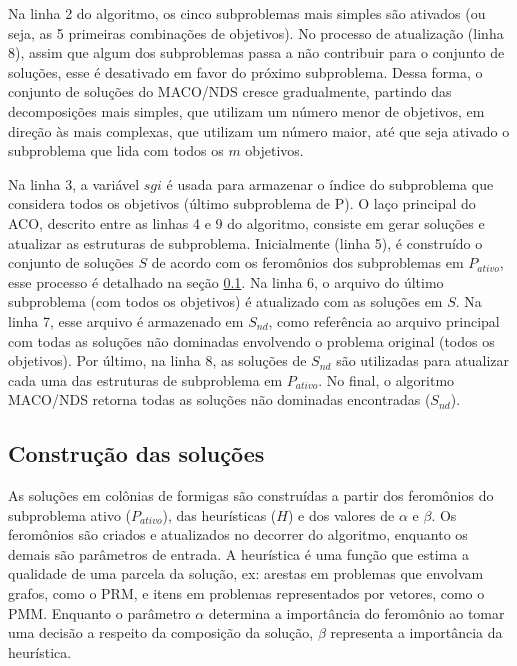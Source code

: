 Na linha 2 do algoritmo, os cinco subproblemas mais simples são ativados (ou seja, as 5 primeiras combinações de objetivos). No processo de atualização (linha 8), assim que algum dos subproblemas passa a não contribuir para o conjunto de soluções, esse é desativado em favor do próximo subproblema. Dessa forma, o conjunto de soluções do MACO/NDS cresce gradualmente, partindo das decomposições mais simples, que utilizam um número menor de objetivos, em direção às mais complexas, que utilizam um número maior, até que seja ativado o subproblema que lida com todos os $m$ objetivos.

Na linha 3, a variável $sgi$ é usada para armazenar o índice do subproblema que considera todos os objetivos (último subproblema de P). O laço principal do ACO, descrito entre as linhas 4 e 9 do algoritmo, consiste em gerar soluções e atualizar as estruturas de subproblema. Inicialmente (linha 5), é construído o conjunto de soluções $S$ de acordo com os feromônios dos subproblemas em $P_{ativo}$, esse processo é detalhado na seção \ref{section_macod_solutions}. Na linha 6, o arquivo do último subproblema (com todos os objetivos) é atualizado com as soluções em $S$. Na linha 7, esse arquivo é armazenado em $S_{nd}$, como referência ao arquivo principal com todas as soluções não dominadas envolvendo o problema original (todos os objetivos). Por último, na linha 8, as soluções de $S_{nd}$ são utilizadas para atualizar cada uma das estruturas de subproblema em $P_{ativo}$. No final, o algoritmo MACO/NDS retorna todas as soluções não dominadas encontradas ($S_{nd}$).

\subsection{Construção das soluções}
\label{section_macod_solutions}

As soluções em colônias de formigas são construídas a partir dos feromônios do subproblema ativo ($P_{ativo}$), das heurísticas ($H$) e dos valores de $\alpha$ e $\beta$. Os feromônios são criados e atualizados no decorrer do algoritmo, enquanto os demais são parâmetros de entrada. A heurística é uma função que estima a qualidade de uma parcela da solução, ex: arestas em problemas que envolvam grafos, como o PRM, e itens em problemas representados por vetores, como o PMM. Enquanto o parâmetro $\alpha$ determina a importância do feromônio ao tomar uma decisão a respeito da composição da solução, $\beta$ representa a importância da heurística.

